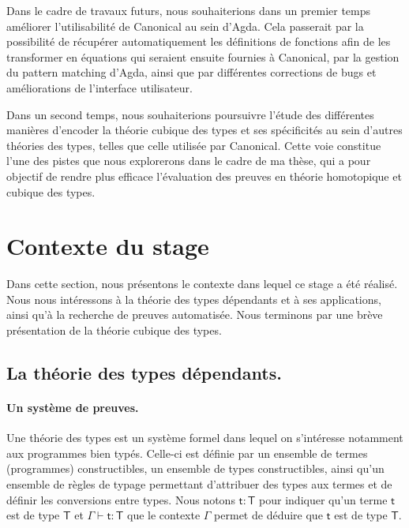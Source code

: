 \documentclass[11pt]{article}
\begin{document}
Dans le cadre de travaux futurs, nous souhaiterions dans un premier temps améliorer l’utilisabilité de Canonical au sein d’Agda. 
Cela passerait par la possibilité de récupérer automatiquement les définitions de fonctions afin de les transformer en équations qui seraient ensuite fournies à Canonical, 
par la gestion du pattern matching d’Agda, ainsi que par différentes corrections de bugs et améliorations de l’interface utilisateur.

Dans un second temps, nous souhaiterions poursuivre l’étude des différentes manières d’encoder la théorie cubique des types et ses spécificités au sein d’autres théories des types, 
telles que celle utilisée par Canonical.
Cette voie constitue l’une des pistes que nous explorerons dans le cadre de ma thèse, 
qui a pour objectif de rendre plus efficace l’évaluation des preuves en théorie homotopique et cubique des types.


\clearpage

\section{Contexte du stage}
Dans cette section, nous présentons le contexte dans lequel ce stage a été réalisé. 
Nous nous intéressons à la théorie des types dépendants et à ses applications, ainsi qu’à la recherche de preuves automatisée. 
Nous terminons par une brève présentation de la théorie cubique des types.

\subsection{La théorie des types dépendants.}

\paragraph{Un système de preuves.}
Une théorie des types est un système formel dans lequel on s’intéresse notamment aux programmes bien typés. 
Celle-ci est définie par un ensemble de termes (programmes) constructibles, un ensemble de types constructibles, 
ainsi qu’un ensemble de règles de typage permettant d’attribuer des types aux termes et de définir les conversions entre types.
Nous notons $\mathsf{t : T}$ pour indiquer qu'un terme $\mathsf{t}$ est de type $\mathsf{T}$ et $\mathsf{\Gamma \vdash t : T}$ 
que le contexte $\mathsf{\Gamma}$ permet de déduire que $\mathsf{t}$ est de type $\mathsf{T}$.
\end{document}
